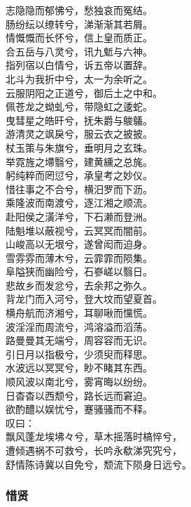 \documentclass[]{article}
\begin{document}
志隐隐而郁怫兮，愁独哀而冤结。\\
肠纷纭以缭转兮，涕渐渐其若屑。\\
情慨慨而长怀兮，信上皇而质正。\\
合五岳与八灵兮，讯九鬿与六神。\\
指列宿以白情兮，诉五帝以置辞。\\
北斗为我折中兮，太一为余听之。\\
云服阴阳之正道兮，御后土之中和。\\
佩苍龙之蚴虬兮，带隐虹之逶蛇。\\
曳彗星之皓旰兮，抚朱爵与鵔鸃。\\
游清灵之飒戾兮，服云衣之披披。\\
杖玉策与朱旗兮，垂明月之玄珠。\\
举霓旌之墆翳兮，建黄纁之总旄。\\
躬纯粹而罔愆兮，承皇考之妙仪。\\
惜往事之不合兮，横汨罗而下沥。\\
乘隆波而南渡兮，逐江湘之顺流。\\
赴阳侯之潢洋兮，下石濑而登洲。\\
陆魁堆以蔽视兮，云冥冥而闇前。\\
山峻高以无垠兮，遂曾闳而迫身。\\
雪雰雰而薄木兮，云霏霏而陨集。\\
阜隘狭而幽险兮，石嵾嵯以翳日。\\
悲故乡而发忿兮，去余邦之弥久。\\
背龙门而入河兮，登大坟而望夏首。\\
横舟航而济湘兮，耳聊啾而戃慌。\\
波淫淫而周流兮，鸿溶溢而滔荡。\\
路曼曼其无端兮，周容容而无识。\\
引日月以指极兮，少须臾而释思。\\
水波远以冥冥兮，眇不睹其东西。\\
顺风波以南北兮，雾宵晦以纷纷。\\
日杳杳以西颓兮，路长远而窘迫。\\
欲酌醴以娱忧兮，蹇骚骚而不释。\\
叹曰：\\
飘风蓬龙埃坲々兮，草木摇落时槁悴兮，\\
遭倾遇祸不可救兮，长吟永欷涕究究兮，\\
舒情陈诗冀以自免兮，颓流下陨身日远兮。

\hypertarget{header-n341}{%
\subsubsection{惜贤}\label{header-n341}}
\end{document}
